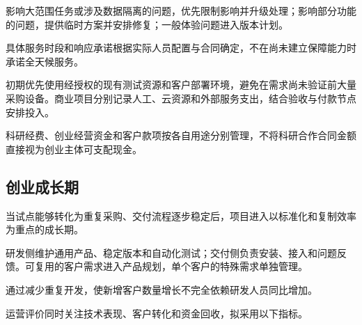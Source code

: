 影响大范围任务或涉及数据隔离的问题，优先限制影响并升级处理；影响部分功能的问题，提供临时方案并安排修复；一般体验问题进入版本计划。

具体服务时段和响应承诺根据实际人员配置与合同确定，不在尚未建立保障能力时承诺全天候服务。

初期优先使用经授权的现有测试资源和客户部署环境，避免在需求尚未验证前大量采购设备。商业项目分别记录人工、云资源和外部服务支出，结合验收与付款节点安排投入。

科研经费、创业经营资金和客户款项按各自用途分别管理，不将科研合作合同金额直接视为创业主体可支配现金。

\subsection{创业成长期}\label{sec:5.2.2}
当试点能够转化为重复采购、交付流程逐步稳定后，项目进入以标准化和复制效率为重点的成长期。

研发侧维护通用产品、稳定版本和自动化测试；交付侧负责安装、接入和问题反馈。可复用的客户需求进入产品规划，单个客户的特殊需求单独管理。

通过减少重复开发，使新增客户数量增长不完全依赖研发人员同比增加。

运营评价同时关注技术表现、客户转化和资金回收，拟采用以下指标。

